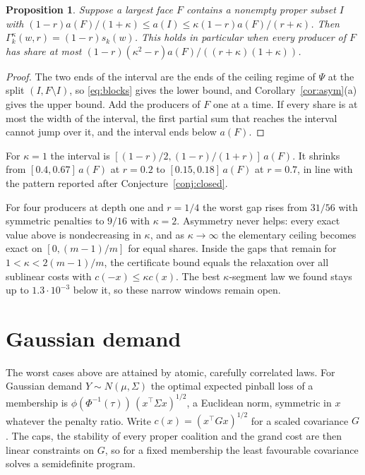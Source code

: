 \documentclass[11pt,a4paper]{article}
\newtheorem{proposition}[theorem]{Proposition}
\theoremstyle{remark}
\begin{document}
\begin{proposition}\label{prop:criterion}
Suppose a largest face $F$ contains a nonempty proper subset $I$ with
$(1-r)a(F)/(1+\kappa)\le a(I)\le\kappa(1-r)a(F)/(r+\kappa)$. Then
$\Gamma_k^\kappa(w,r)=(1-r)s_k(w)$. This holds in particular when every
producer of $F$ has share at most $(1-r)(\kappa^2-r)a(F)/((r+\kappa)(1+\kappa))$.
\end{proposition}

\begin{proof}
The two ends of the interval are the ends of the ceiling regime of $\Psi$ at
the split $(I,F\setminus I)$, so \eqref{eq:blocks} gives the lower bound, and
Corollary~\ref{cor:asym}(a) gives the upper bound. Add the producers of $F$
one at a time. If every share is at most the width of the interval, the
first partial sum that reaches the interval cannot jump over it, and the
interval ends below $a(F)$.
\end{proof}

For $\kappa=1$ the interval is $[(1-r)/2,(1-r)/(1+r)]\,a(F)$. It shrinks from
$[0.4,0.67]\,a(F)$ at $r=0.2$ to $[0.15,0.18]\,a(F)$ at $r=0.7$, in line with
the pattern reported after Conjecture~\ref{conj:closed}.

For four producers at depth one and $r=1/4$ the worst gap rises from $31/56$
with symmetric penalties to $9/16$ with $\kappa=2$. Asymmetry never helps:
every exact value above is nondecreasing in $\kappa$, and as $\kappa\to\infty$
the elementary ceiling becomes exact on $[0,(m-1)/m]$ for equal shares. Inside
the gaps that remain for $1<\kappa<2(m-1)/m$, the certificate bound equals
the relaxation over all sublinear costs with $c(-x)\le\kappa c(x)$. The best
$\kappa$-segment law we found stays up to $1.3\cdot10^{-3}$ below it, so these
narrow windows remain open.

\section{Gaussian demand}\label{sec:gauss}

The worst cases above are attained by atomic, carefully correlated laws. For
Gaussian demand $Y\sim N(\mu,\Sigma)$ the optimal expected pinball loss of a
membership is $\phi(\Phi^{-1}(\tau))\,(x^\top\Sigma x)^{1/2}$, a Euclidean norm,
symmetric in $x$ whatever the penalty ratio. Write $c(x)=(x^\top Gx)^{1/2}$ for
a scaled covariance $G$. The caps, the stability of every proper coalition and
the grand cost are then linear constraints on $G$, so for a fixed membership the
least favourable covariance solves a semidefinite program.
\end{document}
